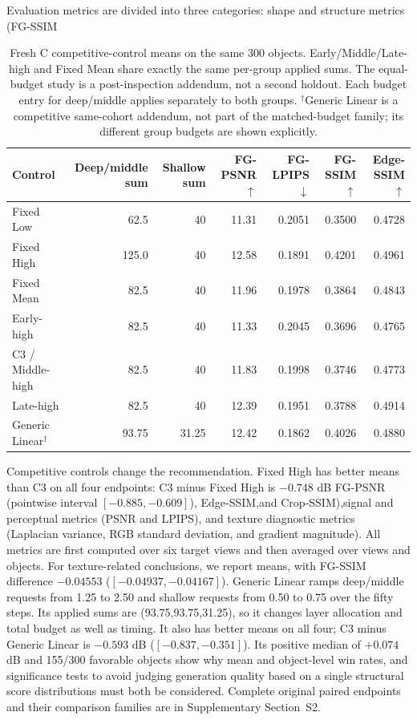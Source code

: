 \documentclass[times,twocolumn,final]{elsarticle}
\providecommand{\DIFadd}[1]{{\protect\color{blue} \sf #1}} %
\providecommand{\DIFdel}[1]{{\protect\color{red} \scriptsize #1}} %
\providecommand{\DIFaddbegin}{} %
\providecommand{\DIFaddend}{} %
\providecommand{\DIFdelbegin}{} %
\providecommand{\DIFdelend}{} %
\begin{document}
\DIFdelbegin \DIFdel{Evaluation metrics are divided into three categories: shape and structure metrics (FG-SSIM}\DIFdelend \DIFaddbegin \begin{table}[t]
\centering\scriptsize\setlength{\tabcolsep}{4pt}
\caption{Fresh C competitive-control means on the same 300 objects. Early/Middle/Late-high and Fixed Mean share exactly the same per-group applied sums. The equal-budget study is a post-inspection addendum, not a second holdout. Each budget entry for deep/middle applies separately to both groups. $^\dagger$Generic Linear is a competitive same-cohort addendum, not part of the matched-budget family; its different group budgets are shown explicitly.}
\label{tab:freshc-absolute}\label{tab:matched-budget300}
\begin{tabular}{lrrrrrr}
\toprule Control & Deep/middle sum & Shallow sum & FG-PSNR$\uparrow$ & FG-LPIPS$\downarrow$ & FG-SSIM$\uparrow$ & Edge-SSIM$\uparrow$ \\
\midrule
Fixed Low & 62.5 & 40 & 11.31 & 0.2051 & 0.3500 & 0.4728 \\
Fixed High & 125.0 & 40 & 12.58 & 0.1891 & 0.4201 & 0.4961 \\
Fixed Mean & 82.5 & 40 & 11.96 & 0.1978 & 0.3864 & 0.4843 \\
Early-high & 82.5 & 40 & 11.33 & 0.2045 & 0.3696 & 0.4765 \\
C3 / Middle-high & 82.5 & 40 & 11.83 & 0.1998 & 0.3746 & 0.4773 \\
Late-high & 82.5 & 40 & 12.39 & 0.1951 & 0.3788 & 0.4914 \\
Generic Linear$^\dagger$ & 93.75 & 31.25 & 12.42 & 0.1862 & 0.4026 & 0.4880 \\

\bottomrule
\end{tabular}
\end{table}

\DIFadd{Competitive controls change the recommendation. Fixed High has better means than C3 on all four endpoints: C3 minus Fixed High is $-0.748$ dB FG-PSNR (pointwise interval $[-0.885,-0.609]$)}\DIFaddend , \DIFdelbegin \DIFdel{Edge-SSIM,and Crop-SSIM),signal and perceptual metrics (PSNR and LPIPS), and texture diagnostic metrics (Laplacian variance, RGB standard deviation, and gradient magnitude). All metrics are first computed over six target views and then averaged over views and objects. For texture-related conclusions, we report means, }\DIFdelend \DIFaddbegin \DIFadd{with FG-SSIM difference $-0.04553$ ($[-0.04937,-0.04167]$). Generic Linear ramps deep/middle requests from 1.25 to 2.50 and shallow requests from 0.50 to 0.75 over the fifty steps. Its applied sums are (93.75,93.75,31.25), so it changes layer allocation and total budget as well as timing. It also has better means on all four; C3 minus Generic Linear is $-0.593$ dB ($[-0.837,-0.351]$). Its positive median of $+0.074$ dB and 155/300 favorable objects show why mean and }\DIFaddend object-level \DIFdelbegin \DIFdel{win rates, and significance tests to avoid judging generation quality based on a single structural score}\DIFdelend \DIFaddbegin \DIFadd{distributions must both be considered. Complete original paired endpoints and their comparison families are in Supplementary Section~S2}\DIFaddend .
\end{document}
